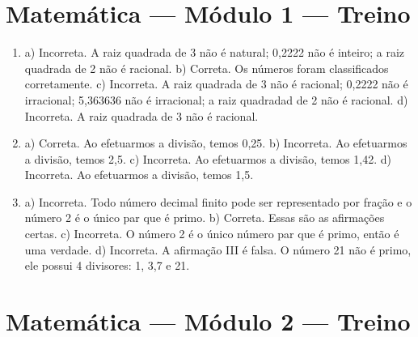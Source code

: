 
\pagebreak

\footnotesize

\pagecolor{gray!40}

\section*{Matemática — Módulo 1 — Treino}

\begin{enumerate}
\item a) Incorreta. A raiz quadrada de 3 não é natural; 0,2222 não é inteiro; a raiz quadrada de 2 não é racional.
b) Correta. Os números foram classificados corretamente.
c) Incorreta. A raiz quadrada de 3 não é racional; 0,2222 não é irracional; 5,363636 não é irracional; a raiz quadradad de 2 não é racional.
d) Incorreta. A raiz quadrada de 3 não é racional.


\item a) Correta. Ao efetuarmos a divisão, temos 0,25.
b) Incorreta. Ao efetuarmos a divisão, temos 2,5.
c) Incorreta. Ao efetuarmos a divisão, temos 1,42.
d) Incorreta. Ao efetuarmos a divisão, temos 1,5.


\item a) Incorreta. Todo número decimal finito pode ser representado por fração e o número 2 é o único par que é primo.
b) Correta. Essas são as afirmações certas.
c) Incorreta. O número 2 é o único número par que é primo, então é uma verdade.
d) Incorreta. A afirmação III é falsa. O número 21 não é primo, ele possui 4 divisores: 1, 3,7 e 21.
\end{enumerate}

\section*{Matemática — Módulo 2 — Treino}

